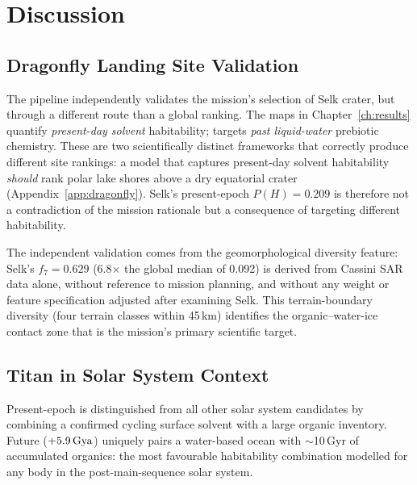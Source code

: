 \chapter{Discussion}
\label{ch:discussion}

\section{Dragonfly Landing Site Validation}
\label{sec:dragonfly_validation}

The pipeline independently validates the \dragonfly{} mission's selection of Selk crater, but through a different route than a global ranking.  The maps in Chapter~\ref{ch:results} quantify \textit{present-day solvent} habitability; \dragonfly{} targets \textit{past liquid-water} prebiotic chemistry.  These are two scientifically distinct frameworks that correctly produce different site rankings: a model that captures present-day solvent habitability \textit{should} rank polar lake shores above a dry equatorial crater (Appendix~\ref{app:dragonfly}).  Selk's present-epoch $P(H) = 0.209$ is therefore not a contradiction of the mission rationale but a consequence of targeting different habitability.

The independent validation comes from the geomorphological diversity feature: Selk's $f_7 = 0.629$ (6.8$\times$ the global median of 0.092) is derived from Cassini SAR data alone, without reference to mission planning, and without any weight or feature specification adjusted after examining Selk.  This terrain-boundary diversity (four terrain classes within 45\,km) identifies the organic--water-ice contact zone that is the mission's primary scientific target.

\section{Titan in Solar System Context}
\label{sec:solar_context}

Present-epoch \titan{} is distinguished from all other solar system candidates by combining a confirmed cycling surface solvent with a large organic inventory.  Future \titan{} ($+5.9\,\text{Gya}$) uniquely pairs a water-based ocean with $\sim$10\,Gyr of accumulated organics: the most favourable habitability combination modelled for any body in the post-main-sequence solar system.

